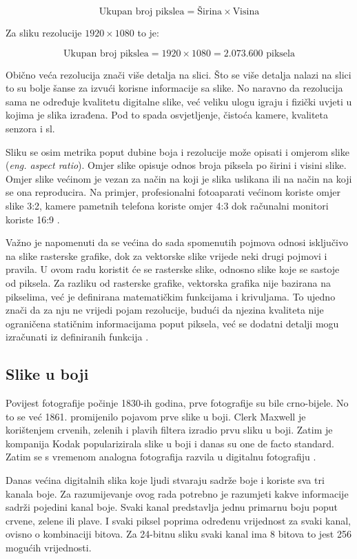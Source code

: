 \documentclass{foi}
\begin{document}
\[
\text{Ukupan broj pikslea} = \text{Širina} \times \text{Visina}
\]

Za sliku rezolucije $1920 \times 1080$ to je:

\[
\text{Ukupan broj pikslea} = 1920 \times 1080 = 2.073.600 \text{ piksela}
\]

Obično veća rezolucija znači više detalja na slici. Što se više detalja nalazi na slici to su bolje šanse za izvući korisne informacije sa slike. No naravno da rezolucija sama ne određuje kvalitetu digitalne slike, već veliku ulogu igraju i fizički uvjeti u kojima je slika izrađena. Pod to spada osvjetljenje, čistoća kamere, kvaliteta senzora i sl.

Sliku se osim metrika poput dubine boja i rezolucije može opisati i omjerom slike (\textit{eng. aspect ratio}). Omjer slike opisuje odnos broja piksela po širini i visini slike. Omjer slike većinom je vezan za način na koji je slika uslikana ili na način na koji se ona reproducira. Na primjer, profesionalni fotoaparati većinom koriste omjer slike 3:2, kamere pametnih telefona koriste omjer 4:3 dok računalni monitori koriste 16:9 \cite{AspectRatio}.

Važno je napomenuti da se većina do sada spomenutih pojmova odnosi isključivo na slike rasterske grafike, dok za vektorske slike vrijede neki drugi pojmovi i pravila. U ovom radu koristit će se rasterske slike, odnosno slike koje se sastoje od piksela. Za razliku od rasterske grafike, vektorska grafika nije bazirana na pikselima, već je definirana matematičkim funkcijama i krivuljama. To ujedno znači da za nju ne vrijedi pojam rezolucije, budući da njezina kvaliteta nije ograničena statičnim informacijama poput piksela, već se dodatni detalji mogu izračunati iz definiranih funkcija \cite{DigitalnaSlika}.

\subsection{Slike u boji}

Povijest fotografije počinje 1830-ih godina, prve fotografije su bile crno-bijele. No to se već 1861. promijenilo pojavom prve slike u boji. Clerk Maxwell je korištenjem crvenih, zelenih i plavih filtera izradio prvu sliku u boji. Zatim je kompanija Kodak popularizirala slike u boji i danas su one de facto standard. Zatim se s vremenom analogna fotografija razvila u digitalnu fotografiju \cite{ImageHistory}.

Danas većina digitalnih slika koje ljudi stvaraju sadrže boje i koriste sva tri kanala boje. Za razumijevanje ovog rada potrebno je razumjeti kakve informacije sadrži pojedini kanal boje. Svaki kanal predstavlja jednu primarnu boju poput crvene, zelene ili plave. I svaki piksel poprima određenu vrijednost za svaki kanal, ovisno o kombinaciji bitova. Za 24-bitnu sliku svaki kanal ima 8 bitova to jest 256 mogućih vrijednosti. 
\end{document}
